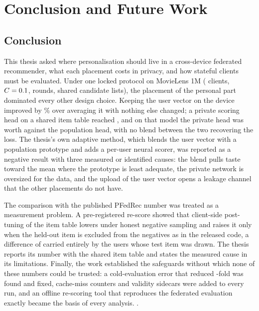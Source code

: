 \chapter{Conclusion and Future Work}
\label{ch:conclusion}

\section{Conclusion}
\label{sec:conc-conclusion}

This thesis asked where personalisation should live in a cross-device federated recommender,
what each placement costs in privacy, and how stateful clients must be evaluated. Under one
locked protocol on MovieLens 1M (\NClients{} clients, $C=0.1$, \NRounds{} rounds,
shared candidate lists), the placement of the personal part dominated every other design
choice. Keeping the user vector on the device improved \ndcg{} by
\GainPersonalizedVsBaselinePct\% over averaging it with nothing else changed; a private scoring
head on a shared item table reached \NdcgPfedrec, and on that model the private head was worth
\DeltaHeadGlobalHead{} against the population head, with no blend between the two recovering
the loss. The thesis's own adaptive method, which blends the user vector with a population
prototype and adds a per-user neural scorer, was reported as a negative result with three
measured or identified causes: the blend pulls taste toward the mean where the prototype is
least adequate, the private network is oversized for the data, and the upload of the user vector
opens a leakage channel that the other placements do not have.

The comparison with the published PFedRec number was treated as a measurement problem. A
pre-registered re-score showed that client-side post-tuning of the item table lowers \ndcg{}
under honest negative sampling and raises it only when the held-out item is excluded from the
negatives as in the released code, a difference of \PtContrastEOne{} carried entirely by the
\PtContrastEOneNonZero{} users whose test item was drawn. The thesis reports its number with
the shared item table and states the measured cause in its limitations. Finally, the work
established the safeguards without which none of these numbers could be trusted: a
cold-evaluation error that reduced \ndcg{} \ColdEvalRatio-fold was found and fixed, cache-miss
counters and validity sidecars were added to every run, and an offline re-scoring tool that
reproduces the federated evaluation exactly became the basis of every analysis.
.

